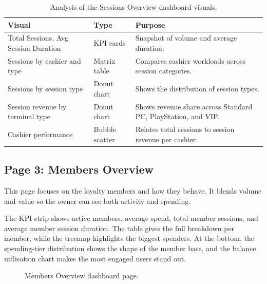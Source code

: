 \documentclass[12pt, a4paper]{report}
\begin{document}
\begin{table}[H]
  \centering
  \caption{Analysis of the Sessions Overview dashboard visuals.\label{tab:rank_analysis}}
  \begin{tabular}{p{3.5cm} p{2.5cm} p{7cm}}
    \toprule
    \textbf{Visual} & \textbf{Type} & \textbf{Purpose} \\
    \midrule
    Total Sessions, Avg Session Duration
      & KPI cards
      & Snapshot of volume and average duration. \\[4pt]
    Sessions by cashier and type
      & Matrix table
      & Compares cashier workloads across session categories. \\[4pt]
    Sessions by session type
      & Donut chart
      & Shows the distribution of session types. \\[4pt]
    Session revenue by terminal type
      & Donut chart
      & Shows revenue share across Standard PC, PlayStation, and VIP. \\[4pt]
    Cashier performance
      & Bubble scatter
      & Relates total sessions to session revenue per cashier. \\
    \bottomrule
  \end{tabular}
\end{table}

\subsection{Page 3: Members Overview}

This page focuses on the loyalty members and how they behave. It blends volume and
value so the owner can see both activity and spending.

The KPI strip shows active members, average spend, total member sessions, and
average member session duration. The table gives the full breakdown per member,
while the treemap highlights the biggest spenders. At the bottom, the spending-tier
distribution shows the shape of the member base, and the balance utilisation chart
makes the most engaged users stand out.

\begin{figure}[H]
  \centering
  \caption{Members Overview dashboard page.\label{fig:dash_members}}
\end{figure}
\end{document}
